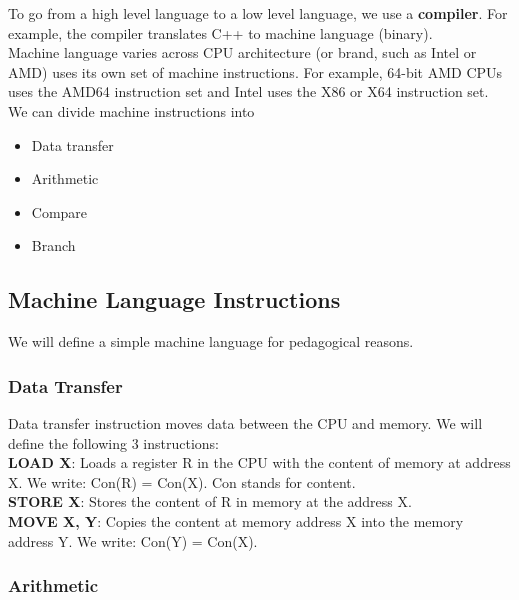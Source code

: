 \documentclass[]{article}
\begin{document}
To go from a high level language to a low level language, we use a \textbf{compiler}. For example, the compiler translates C++ to machine language (binary).\\

Machine language varies across CPU architecture (or brand, such as Intel or AMD) uses its own set of machine instructions. For example, 64-bit AMD CPUs uses the AMD64 instruction set and Intel uses the X86 or X64 instruction set.\\

We can divide machine instructions into 

\begin{itemize}
	\item Data transfer
	\item Arithmetic
	\item Compare
	\item Branch
\end{itemize}\bigbreak


\subsection{Machine Language Instructions}
\bigbreak

We will define a simple machine language for pedagogical reasons. 

\subsubsection{Data Transfer}
\bigbreak

Data transfer instruction moves data between the CPU and memory. We will define the following 3 instructions:\\

\textbf{LOAD X}: Loads a register R in the CPU with the content of memory at address X. We write: Con(R) = Con(X). Con stands for content.\\

\textbf{STORE X}: Stores the content of R in memory at the address X.\\

\textbf{MOVE X, Y}: Copies the content at memory address X into the memory address Y. We write: Con(Y) = Con(X).\\


\subsubsection{Arithmetic}
\bigbreak
\end{document}
